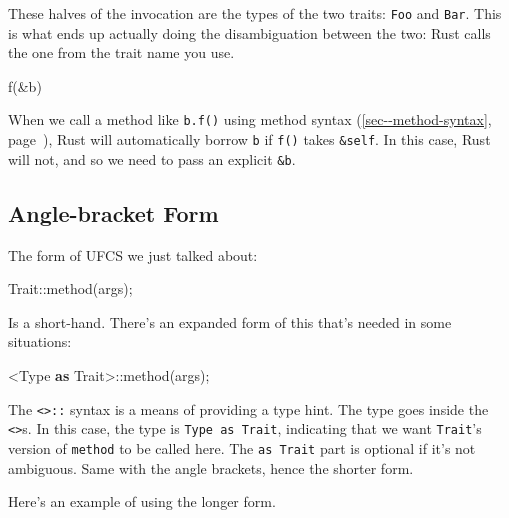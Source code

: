\documentclass[a4paper,]{book}
\renewcommand*{\hyperref}[2][\ar]{%
  \def\ar{#2}%
  #2 (\autoref{#1}, page~\pageref{#1})}
\newenvironment{Shaded}{\begin{snugshade}}{\end{snugshade}}
\newcommand{\KeywordTok}[1]{\textcolor[rgb]{0.13,0.29,0.53}{\textbf{{#1}}}}
\newcommand{\NormalTok}[1]{{#1}}
\begin{document}
These halves of the invocation are the types of the two traits:
\texttt{Foo} and \texttt{Bar}. This is what ends up actually doing the
disambiguation between the two: Rust calls the one from the trait name
you use.

\begin{Shaded}
\begin{Highlighting}[]
\NormalTok{f(&b)}
\end{Highlighting}
\end{Shaded}

When we call a method like \texttt{b.f()} using
\hyperref[sec--method-syntax]{method syntax}, Rust will automatically
borrow \texttt{b} if \texttt{f()} takes \texttt{\&self}. In this case,
Rust will not, and so we need to pass an explicit \texttt{\&b}.

\subsection{Angle-bracket Form}\label{angle-bracket-form}

The form of UFCS we just talked about:

\begin{Shaded}
\begin{Highlighting}[]
\NormalTok{Trait::method(args);}
\end{Highlighting}
\end{Shaded}

Is a short-hand. There's an expanded form of this that's needed in some
situations:

\begin{Shaded}
\begin{Highlighting}[]
\NormalTok{<Type }\KeywordTok{as} \NormalTok{Trait>::method(args);}
\end{Highlighting}
\end{Shaded}

The \texttt{\textless{}\textgreater{}::} syntax is a means of providing
a type hint. The type goes inside the
\texttt{\textless{}\textgreater{}}s. In this case, the type is
\texttt{Type\ as\ Trait}, indicating that we want \texttt{Trait}'s
version of \texttt{method} to be called here. The \texttt{as\ Trait}
part is optional if it's not ambiguous. Same with the angle brackets,
hence the shorter form.

Here's an example of using the longer form.
\end{document}
